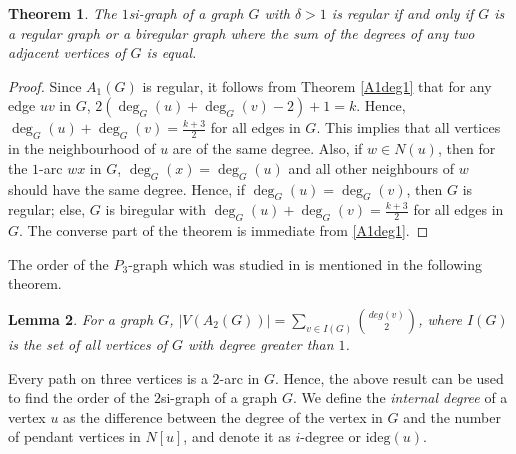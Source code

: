 \documentclass[12pt,a4paper,twoside]{article}
\newcommand{\ideg}[1]{\mathrm{ideg}}
\newtheorem{theorem}{Theorem}[section]
\newtheorem{lemma}[theorem]{Lemma}
\theoremstyle{casesty}
\theoremstyle{subcasesty}
\theoremstyle{schemesty}
\begin{document}
\begin{theorem}
	The $1$si-graph of a graph $G$ with $\delta>1$ is regular if and only if $G$ is a regular graph or a biregular graph where the sum of the degrees of any two adjacent vertices of $G$ is equal.
\end{theorem}
\begin{proof}
	Since $A_{1}(G)$ is regular, it follows from Theorem \ref{A1deg1} that for any edge $uv$ in $G$, $2(\deg_{G}(u)+\deg_{G}(v)-2)+1=k$. Hence, $\deg_{G}(u)+\deg_{G}(v)=\frac{k+3}{2}$ for all edges in $G$. This implies that all vertices in the neighbourhood of $u$ are of the same degree. Also, if $w\in N(u)$, then for the $1$-arc $wx$ in $G$, $\deg_{G}(x)=\deg_{G}(u)$ and all other neighbours of $w$ should have the same degree. Hence, if $\deg_{G}(u)=\deg_{G}(v)$, then $G$ is regular; else, $G$ is biregular with $\deg_{G}(u)+\deg_{G}(v)=\frac{k+3}{2}$ for all edges in $G$. The converse part of the theorem is immediate from \ref{A1deg1}. 
\end{proof}


The order of the $P_{3}$-graph which was studied in \cite{broersma1989path} is mentioned in the following theorem. 

\begin{lemma} {\rm \cite{broersma1989path}}
	For a graph $G$, $|V(A_{2}(G))| = \sum\limits_{v \in I(G)} {deg(v) \choose 2}$, where $I(G)$ is the set of all vertices of $G$ with degree greater than $1$. 
\end{lemma}

Every path on three vertices is a $2$-arc in $G$. Hence, the above result can be used to find the order of the $2$si-graph of a graph $G$. We define the \emph{internal degree} of a vertex $u$ as the difference between the degree of the vertex in $G$ and the number of pendant vertices in $N[u]$, and denote it as $i$-degree or $\ideg{G}(u)$.
\end{document}
